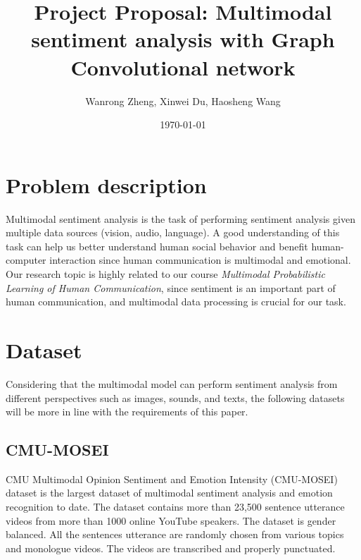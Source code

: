 \documentclass[11pt]{article}
\title{Project Proposal: Multimodal sentiment analysis with Graph Convolutional network }
\author{
  Wanrong Zheng,
  Xinwei Du,
  Haosheng Wang
  }
\date{\today}
\begin{document}
\maketitle

\section{Problem description}
Multimodal sentiment analysis is the task of performing sentiment analysis given multiple data sources (vision, audio, language).
A good understanding of this task can help us better understand human social behavior and benefit human-computer interaction since human communication is multimodal and emotional.
Our research topic is highly related to our course \textit{Multimodal Probabilistic Learning of Human Communication}, since sentiment is an important part of human communication, and multimodal data processing is crucial for our task.

\section{Dataset}

Considering that the multimodal model can perform sentiment analysis from different perspectives such as images, sounds, and texts, the following datasets will be more in line with the requirements of this paper.

\subsection{CMU-MOSEI}
CMU Multimodal Opinion Sentiment and Emotion Intensity (CMU-MOSEI) dataset is the largest dataset of multimodal sentiment analysis and emotion recognition to date. The dataset contains more than 23,500 sentence utterance videos from more than 1000 online YouTube speakers. The dataset is gender balanced. All the sentences utterance are randomly chosen from various topics and monologue videos. The videos are transcribed and properly punctuated.
\end{document}
